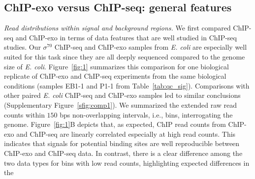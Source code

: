 \documentclass{bmcart}
\newcommand{\SK}[1]{\textcolor{red}{SK: #1}}
\newcommand{\sig}{\sigma^{70}}
\begin{document}
\subsection*{ChIP-exo versus ChIP-seq: general features}

\textit{Read distributions within signal and background regions.} We
first compared ChIP-seq and ChIP-exo in terms of data features that
are well studied in ChIP-seq studies.  Our $\sig$ ChIP-seq and
ChIP-exo samples from \textit{E. coli} are especially well suited for
this task since they are all deeply sequenced compared to the genome
size of \textit{E. coli}.  Figure~\ref{fig:1} summarizes this
comparison for one biological replicate of ChIP-exo and ChIP-seq
experiments from the same biological conditions (samples EB1-1 and
P1-1 from Table~\ref{tab:qc_sig}). Comparisons with other paired
\textit{E. coli} ChIP-seq and ChIP-exo samples led to similar
conclusions (Supplementary Figure~\ref{sfig:comp1}).
We summarized the extended raw read counts within $150$ bps
non-overlapping intervals, i.e., bins, interrogating the genome.
Figure~\ref{fig:1}B depicts that, as expected, ChIP read counts
from ChIP-exo and ChIP-seq are linearly correlated especially at high
read counts. This indicates that signals for potential binding sites
are well reproducible between ChIP-exo and ChIP-seq data.  In
contrast, there is a clear difference among the two data types for
bins with low read counts, highlighting expected differences in the
\end{document}
